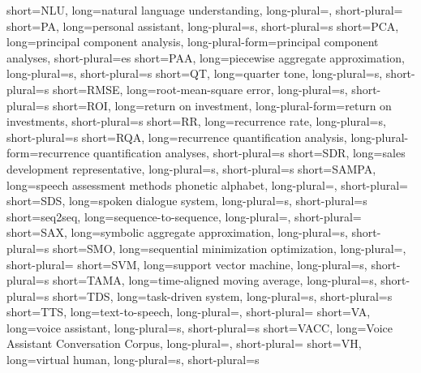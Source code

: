 	{short=NLU, 	long=natural language understanding, 				long-plural=, short-plural=}
		{short=PA, 		long=personal assistant, 							long-plural=s, short-plural=s}
	{short=PCA,		long=principal component analysis, 					long-plural-form=principal component analyses, short-plural=es}
	{short=PAA,		long=piecewise aggregate approximation, 			long-plural=s, short-plural=s}
		{short=QT,	 	long=quarter tone, long-plural=s, short-plural=s}
	{short=RMSE, 	long=root-mean-square error,						long-plural=s, short-plural=s}
	{short=ROI, 	long=return on investment,							long-plural-form=return on investments, short-plural=s}
		{short=RR,	 	long=recurrence rate,								long-plural=s, short-plural=s}
	{short=RQA,	 	long=recurrence quantification analysis,			long-plural-form=recurrence quantification analyses, short-plural=s}
	{short=SDR, 	long=sales development representative,				long-plural=s, short-plural=s}
	{short=SAMPA, 	long=speech assessment methods phonetic alphabet, 	long-plural=, short-plural=}
	{short=SDS, 	long=spoken dialogue system, 						long-plural=s, short-plural=s}
	{short=seq2seq,	long=sequence-to-sequence,				 			long-plural=, short-plural=}
	{short=SAX,		long=symbolic aggregate approximation,				long-plural=s, short-plural=s}
	{short=SMO, 	long=sequential minimization optimization, 			long-plural=, short-plural=}
	{short=SVM, 	long=support vector machine, 						long-plural=s, short-plural=s}
	{short=TAMA, 	long=time-aligned moving average, 					long-plural=s, short-plural=s}
	{short=TDS, 	long=task-driven system,							long-plural=s, short-plural=s}
	{short=TTS, 	long=text-to-speech,								long-plural=, short-plural=}
		{short=VA, 		long=voice assistant, 								long-plural=s, short-plural=s}
	{short=VACC, 	long=Voice Assistant Conversation Corpus, 			long-plural=, short-plural=}
		{short=VH, 		long=virtual human, 								long-plural=s, short-plural=s}

\usepackage[	
	natbib=true,
	style=authoryear-comp,
	sorting=ynt, %
	hyperref=true,
	backend=biber,
	maxbibnames=99,
	giveninits=false,
	uniquename=false, %
	uniquelist=false,
	maxcitenames=2,
	mincitenames=1,
	parentracker=true,
	url=true,
	doi=true,
	isbn=true,
	eprint=true,
	backref=true,]
	{biblatex}


